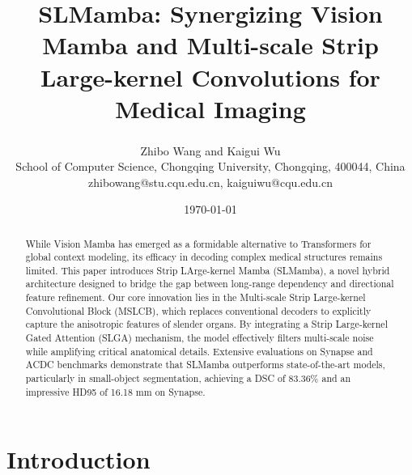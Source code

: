 \documentclass[10pt, a4paper, twocolumn]{article}
\begin{document}

\title{SLMamba: Synergizing Vision Mamba and Multi-scale Strip Large-kernel Convolutions for Medical Imaging}
\author{Zhibo Wang and Kaigui Wu\textsuperscript{\Letter} \\ School of Computer Science, Chongqing University, Chongqing, 400044, China\\zhibowang@stu.cqu.edu.cn, kaiguiwu@cqu.edu.cn}


\date{\today}

\maketitle

\begin{abstract}

While Vision Mamba has emerged as a formidable alternative to Transformers for global context modeling, its efficacy in decoding complex medical structures remains limited. This paper introduces Strip LArge-kernel Mamba (SLMamba), a novel hybrid architecture designed to bridge the gap between long-range dependency and directional feature refinement. Our core innovation lies in the Multi-scale Strip Large-kernel Convolutional Block (MSLCB), which replaces conventional decoders to explicitly capture the anisotropic features of slender organs. By integrating a Strip Large-kernel Gated Attention (SLGA) mechanism, the model effectively filters multi-scale noise while amplifying critical anatomical details. Extensive evaluations on Synapse and ACDC benchmarks demonstrate that SLMamba outperforms state-of-the-art models, particularly in small-object segmentation, achieving a DSC of 83.36\% and an impressive HD95 of 16.18 mm on Synapse.
    


\end{abstract}





\section{Introduction}
\end{document}
